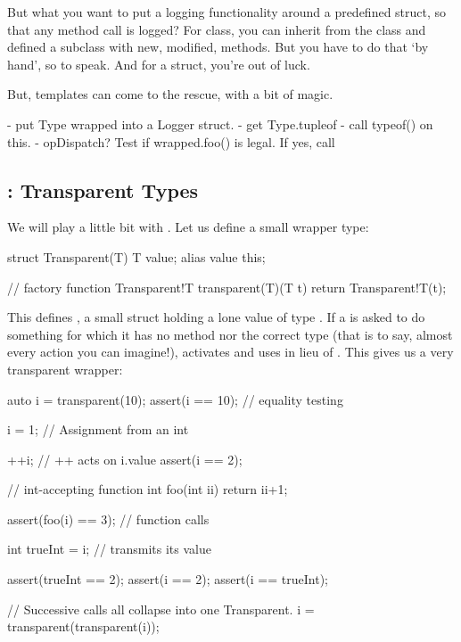 But what you want to put a logging functionality around a predefined struct, so that any method call is logged? For class, you can inherit from the class and defined a subclass with new, modified, methods. But you have to do that `by hand', so to speak. And for a struct, you're out of luck.

But, templates can come to the rescue, with a bit of  magic.


- put Type wrapped into a Logger struct.
- get Type.tupleof
- call typeof() on this.
- opDispatch? Test if wrapped.foo() is legal. If yes, call

\subsection{\texorpdfstring{: Transparent Types}
                           {alias this: Transparent Types}}
\label{transparenttypes}

We will play a little bit with . Let us define a small wrapper type:

\begin{dcode}
struct Transparent(T)
{
    T value;
    alias value this;
}

// factory function
Transparent!T transparent(T)(T t)
{
    return Transparent!T(t);
}
\end{dcode}

This defines , a small struct holding a lone value of type . If a  is asked to do something for which it has no method nor the correct type (that is to say, almost every action you can imagine!),  activates and uses  in lieu of . This gives us a very transparent wrapper:

\begin{dcode}
auto i = transparent(10);
assert(i == 10); // equality testing

i = 1; // Assignment from an int

++i; // ++ acts on i.value
assert(i == 2); 

// int-accepting function
int foo(int ii) { return ii+1;}

assert(foo(i) == 3); // function calls

int trueInt = i; // transmits its value

assert(trueInt == 2);
assert(i == 2);
assert(i == trueInt);

// Successive calls all collapse into one Transparent.
i = transparent(transparent(i));
\end{dcode}


